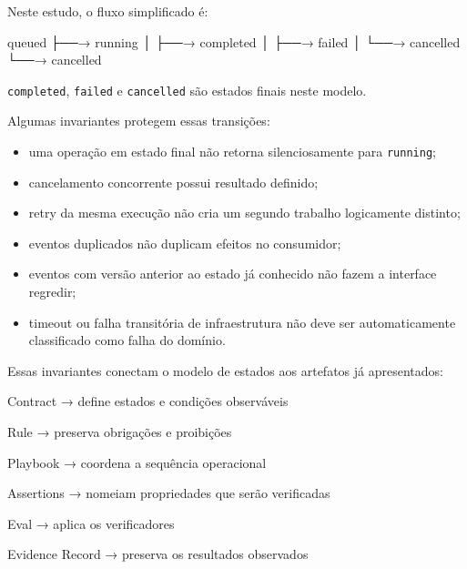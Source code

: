 \documentclass[
  10pt,
  a4paper,
  oneside]{book}
\newenvironment{Shaded}{}{}
\newcommand{\NormalTok}[1]{#1}
\providecommand{\tightlist}{%
  \setlength{\itemsep}{0pt}\setlength{\parskip}{0pt}}
\renewenvironment{Shaded}{\begin{snugshade}}{\end{snugshade}}%
\begin{document}
Neste estudo, o fluxo simplificado é:

\begin{Shaded}
\begin{Highlighting}[]
\NormalTok{queued}
\NormalTok{  ├──→ running}
\NormalTok{  │      ├──→ completed}
\NormalTok{  │      ├──→ failed}
\NormalTok{  │      └──→ cancelled}
\NormalTok{  └──→ cancelled}
\end{Highlighting}
\end{Shaded}

\texttt{completed}, \texttt{failed} e \texttt{cancelled} são estados
finais neste modelo.

Algumas invariantes protegem essas transições:

\begin{itemize}
\tightlist
\item
  uma operação em estado final não retorna silenciosamente para
  \texttt{running};
\item
  cancelamento concorrente possui resultado definido;
\item
  retry da mesma execução não cria um segundo trabalho logicamente
  distinto;
\item
  eventos duplicados não duplicam efeitos no consumidor;
\item
  eventos com versão anterior ao estado já conhecido não fazem a
  interface regredir;
\item
  timeout ou falha transitória de infraestrutura não deve ser
  automaticamente classificado como falha do domínio.
\end{itemize}

Essas invariantes conectam o modelo de estados aos artefatos já
apresentados:

\begin{Shaded}
\begin{Highlighting}[]
\NormalTok{Contract}
\NormalTok{→ define estados e condições observáveis}

\NormalTok{Rule}
\NormalTok{→ preserva obrigações e proibições}

\NormalTok{Playbook}
\NormalTok{→ coordena a sequência operacional}

\NormalTok{Assertions}
\NormalTok{→ nomeiam propriedades que serão verificadas}

\NormalTok{Eval}
\NormalTok{→ aplica os verificadores}

\NormalTok{Evidence Record}
\NormalTok{→ preserva os resultados observados}
\end{Highlighting}
\end{Shaded}
\end{document}
